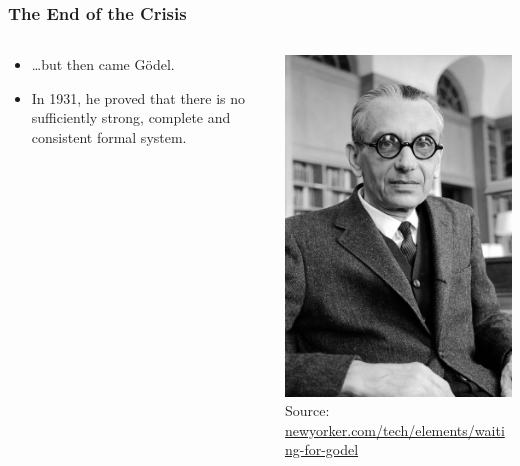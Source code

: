 \documentclass{beamer}
\begin{document}
\begin{frame}
    \frametitle{The End of the Crisis}
\begin{columns}
 \begin{column}{.49\textwidth}
    \begin{itemize}[<+->]
	\item \ldots but then came Gödel.
	\item In 1931, he proved that there is no sufficiently strong, complete and consistent formal system.
    \end{itemize}
 \end{column}
 \begin{column}{.49\textwidth}
  \centering\includegraphics[height=0.35\textheight]{img/goedel.jpg}\\
		\scriptsize{Source: \url{newyorker.com/tech/elements/waiting-for-godel}}
 \end{column}
\end{columns}
\end{frame}
\end{document}
